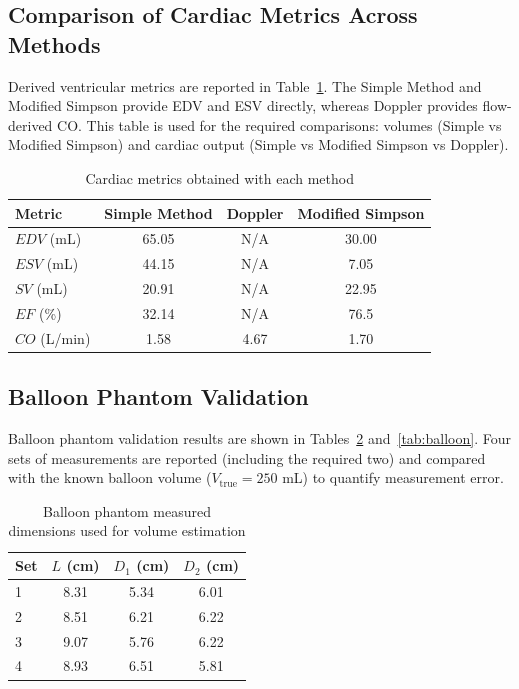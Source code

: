 \subsection{Comparison of Cardiac Metrics Across Methods}
Derived ventricular metrics are reported in Table~\ref{tab:method-comparison}. The Simple Method and Modified Simpson provide EDV and ESV directly, whereas Doppler provides flow-derived CO. This table is used for the required comparisons: volumes (Simple vs Modified Simpson) and cardiac output (Simple vs Modified Simpson vs Doppler).

\begin{table}[htbp]
\caption{Cardiac metrics obtained with each method}
\label{tab:method-comparison}
\centering
\begin{tabular}{lccc}
\toprule
Metric & Simple Method & Doppler & Modified Simpson \\
\midrule
$EDV$ (mL) & 65.05 & N/A & 30.00 \\
$ESV$ (mL) & 44.15 & N/A & 7.05 \\
$SV$ (mL)  & 20.91 & N/A & 22.95 \\
$EF$ (\%) & 32.14 & N/A & 76.5 \\
$CO$ (L/min) & 1.58 & 4.67 & 1.70 \\
\bottomrule
\end{tabular}
\end{table}

\subsection{Balloon Phantom Validation}
Balloon phantom validation results are shown in Tables~\ref{tab:balloon-inputs} and~\ref{tab:balloon}. Four sets of measurements are reported (including the required two) and compared with the known balloon volume ($V_{\mathrm{true}} = 250$ mL) to quantify measurement error.

\begin{table}[htbp]
\caption{Balloon phantom measured dimensions used for volume estimation}
\label{tab:balloon-inputs}
\centering
\begin{tabular}{lccc}
\toprule
Set & $L$ (cm) & $D_1$ (cm) & $D_2$ (cm) \\
\midrule
1 & 8.31 & 5.34 & 6.01 \\
2 & 8.51 & 6.21 & 6.22 \\
3 & 9.07 & 5.76 & 6.22 \\
4 & 8.93 & 6.51 & 5.81 \\
\bottomrule
\end{tabular}
\end{table}


